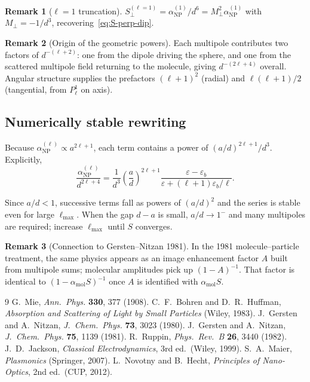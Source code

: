 \documentclass[11pt,a4paper]{article}
\theoremstyle{definition}
\newtheorem{remark}{Remark}[section]
\newcommand{\epsb}{\varepsilon_b}
\newcommand{\epsm}{\varepsilon}
\newcommand{\alpham}{\alpha_{\text{mol}}}
\newcommand{\alphanp}{\alpha_{\text{NP}}}
\begin{document}
\begin{remark}[$\ell=1$ truncation]
\noindent
$S_\perp^{(\ell=1)}=\alphanp^{(1)}/d^6=M_\perp^2\alphanp^{(1)}$ with $M_\perp=-1/d^3$, recovering~\eqref{eq:S-perp-dip}.
\end{remark}

\begin{remark}[Origin of the geometric powers]
\noindent
Each multipole contributes two factors of $d^{-(\ell+2)}$: one from the dipole driving the sphere, and one from the scattered multipole field returning to the molecule, giving $d^{-(2\ell+4)}$ overall. Angular structure supplies the prefactors $(\ell+1)^2$ (radial) and $\ell(\ell+1)/2$ (tangential, from $P_\ell^1$ on axis).
\end{remark}

\subsection{Numerically stable rewriting}

\noindent
Because $\alphanp^{(\ell)}\propto a^{2\ell+1}$, each term contains a power of $(a/d)^{2\ell+1}/d^3$. Explicitly,
\begin{equation}
  \frac{\alphanp^{(\ell)}}{d^{2\ell+4}}
  =
  \frac{1}{d^3}
  \left(\frac{a}{d}\right)^{2\ell+1}
  \frac{\epsm-\epsb}{\epsm+(\ell+1)\epsb/\ell} .
  \label{eq:stable-term}
\end{equation}

\noindent
Since $a/d<1$, successive terms fall as powers of $(a/d)^2$ and the series is stable even for large $\ell_{\max}$. When the gap $d-a$ is small, $a/d\to 1^-$ and many multipoles are required; increase $\ell_{\max}$ until $S$ converges.

\begin{remark}[Connection to Gersten--Nitzan 1981]
\noindent
In the 1981 molecule--particle treatment, the same physics appears as an image enhancement factor $A$ built from multipole sums; molecular amplitudes pick up $(1-A)^{-1}$. That factor is identical to $(1-\alpham S)^{-1}$ once $A$ is identified with $\alpham S$.
\end{remark}

\begin{thebibliography}{9}
  G.~Mie, \emph{Ann.\ Phys.} \textbf{330}, 377 (1908).
  C.~F.~Bohren and D.~R.~Huffman, \emph{Absorption and Scattering of Light by Small Particles} (Wiley, 1983).
  J.~Gersten and A.~Nitzan, \emph{J.\ Chem.\ Phys.} \textbf{73}, 3023 (1980).
  J.~Gersten and A.~Nitzan, \emph{J.\ Chem.\ Phys.} \textbf{75}, 1139 (1981).
  R.~Ruppin, \emph{Phys.\ Rev.\ B} \textbf{26}, 3440 (1982).
  J.~D.~Jackson, \emph{Classical Electrodynamics}, 3rd ed.\ (Wiley, 1999).
  S.~A.~Maier, \emph{Plasmonics} (Springer, 2007).
  L.~Novotny and B.~Hecht, \emph{Principles of Nano-Optics}, 2nd ed.\ (CUP, 2012).
\end{thebibliography}
\end{document}
